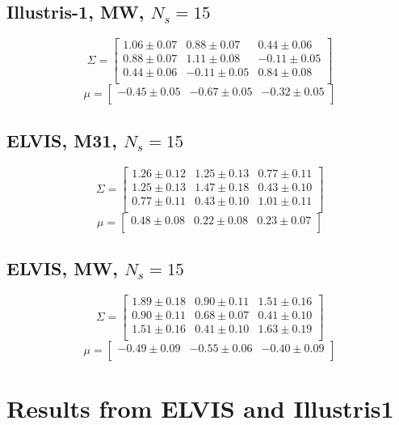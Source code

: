 \documentclass[a4paper,fleqn,usenatbib]{mnras}
\begin{document}
\subsection{Illustris-1, MW, $N_s=15$}
\[
\Sigma=
\begin{bmatrix}
1.06 \pm 0.07 & 0.88 \pm 0.07 & 0.44 \pm 0.06\\
0.88 \pm 0.07 & 1.11 \pm 0.08 & -0.11 \pm 0.05\\
0.44 \pm 0.06 & -0.11 \pm 0.05 & 0.84 \pm 0.08\\
\end{bmatrix}
\]
\[
\mu=
\begin{bmatrix}
-0.45 \pm 0.05 & -0.67 \pm 0.05 & -0.32 \pm 0.05\\
\end{bmatrix}
\]

\subsection{ELVIS, M31, $N_s=15$}
\[
\Sigma=
\begin{bmatrix}
1.26 \pm 0.12 & 1.25 \pm 0.13 & 0.77 \pm 0.11\\
1.25 \pm 0.13 & 1.47 \pm 0.18 & 0.43 \pm 0.10\\
0.77 \pm 0.11 & 0.43 \pm 0.10 & 1.01 \pm 0.11\\
\end{bmatrix}
\]
\[
\mu=
\begin{bmatrix}
0.48 \pm 0.08 & 0.22 \pm 0.08 & 0.23 \pm 0.07\\
\end{bmatrix}
\]
\subsection{ELVIS, MW, $N_s=15$}
\[
\Sigma=
\begin{bmatrix}
1.89 \pm 0.18 & 0.90 \pm 0.11 & 1.51 \pm 0.16\\
0.90 \pm 0.11 & 0.68 \pm 0.07 & 0.41 \pm 0.10\\
1.51 \pm 0.16 & 0.41 \pm 0.10 & 1.63 \pm 0.19\\
\end{bmatrix}
\]
\[
\mu=
\begin{bmatrix}
-0.49 \pm 0.09 & -0.55 \pm 0.06 & -0.40 \pm 0.09\\
\end{bmatrix}
\]


\section{Results from ELVIS and Illustris1}
\label{appendix:plots}
\end{document}
